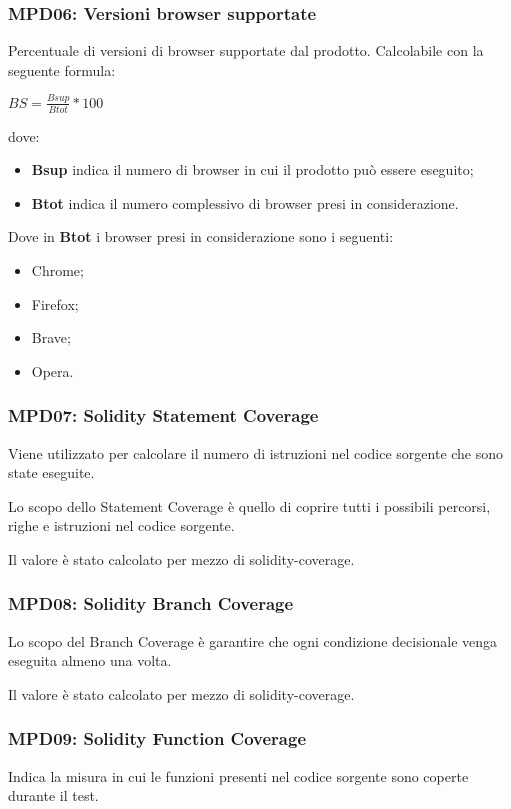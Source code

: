 \subsubsection{MPD06: Versioni browser supportate}\label{sssec:versioni_browser_supportate}
Percentuale di versioni di browser supportate dal prodotto.
Calcolabile con la seguente formula:
\begin{center}
    $BS = \displaystyle \frac{Bsup}{Btot}*100$
\end{center}
dove:
\begin{itemize}
    \item \textbf{Bsup} indica il numero di browser in cui il prodotto può essere eseguito;
    \item \textbf{Btot} indica il numero complessivo di browser presi in considerazione.
\end{itemize}
Dove in \textbf{Btot} i browser presi in considerazione sono i seguenti:
\begin{itemize}
    \item Chrome;
    \item Firefox;
    \item Brave;
    \item Opera.
\end {itemize} 

\subsubsection{MPD07: Solidity Statement Coverage}\label{sssec:solidity_statement_coverage}
Viene utilizzato per calcolare il numero di istruzioni nel codice sorgente che sono state eseguite.

Lo scopo dello Statement Coverage è quello di coprire tutti i possibili percorsi, righe e istruzioni nel codice sorgente.

Il valore è stato calcolato per mezzo di solidity-coverage.

\subsubsection{MPD08: Solidity Branch Coverage}\label{sssec:solidity_branch_coverage}
Lo scopo del Branch Coverage è garantire che ogni condizione decisionale venga eseguita almeno una volta.

Il valore è stato calcolato per mezzo di solidity-coverage.

\subsubsection{MPD09: Solidity Function Coverage}\label{sssec:solidity_function_coverage}
Indica la misura in cui le funzioni presenti nel codice sorgente sono coperte durante il test.

